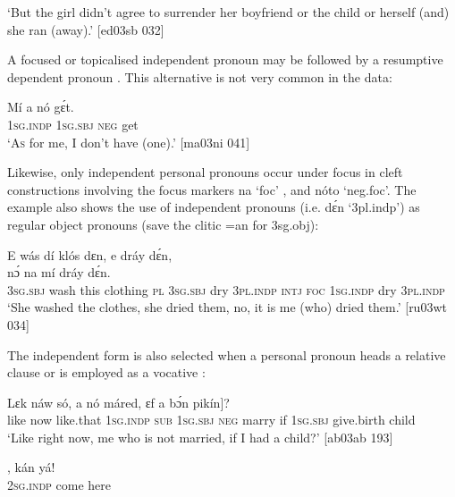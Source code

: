 \glt ‘But the girl didn’t agree to surrender her boyfriend or the child or herself (and) she ran (away).’ [ed03sb 032]
\z


A focused or topicalised independent pronoun may be followed by a resumptive dependent pronoun . This alternative is not very common in the data:


\ea%
    \label{ex:key:280}
    \gll Mí    a    nó  gɛ́t.\\
\textsc{1sg.indp}  \textsc{1sg.sbj}  \textsc{neg}  get\\

\glt ‘\textsc{As} for me, I don’t have (one).’ [ma03ni 041]
\z

Likewise, only independent personal pronouns occur under focus in cleft constructions {\fff}involving the focus markers na ‘foc’ , and nóto ‘neg.foc’. The example also shows the use of independent pronouns (i.e. dɛ́n ‘3pl.indp’) as regular object pronouns (save the clitic =an for 3sg.obj):


\ea%
    \label{ex:key:281}
    \gll E    wás    dí  klós    dɛn,    e    dráy    dɛ́n,\\
nɔ́  na  mí    dráy    dɛ́n.\\
\textsc{3sg.sbj}  wash  this  clothing  \textsc{pl}    \textsc{3sg.sbj}  dry    \textsc{3pl.indp}
\textsc{intj}  \textsc{foc}  \textsc{1sg.indp}  dry    \textsc{3pl.indp}\\

\glt ‘She washed the clothes, she dried them, no, it is me (who) dried them.’
[ru03wt 034]
\z

The independent form is also selected when a personal pronoun heads a relative clause  or is employed as a vocative :


\ea%
    \label{ex:key:282}
    \gll Lɛk  náw    só,     \textstylePichiexamplebold{\textmd{[}} a    nó  máred,
ɛf  a    bɔ́n      pikín]?\\
like  now    like.that  \textsc{1sg.indp}  \textsc{sub}  \textsc{1sg.sbj}  \textsc{neg}  marry
if  \textsc{1sg.sbj}  give.birth  child \\

\glt ‘Like right now, me who is not married, if I had a child?’ [ab03ab 193]
\z


\ea%
    \label{ex:key:283}
    \gll {},    kán    yá!\\
\textsc{2sg.indp}  come  here\\

